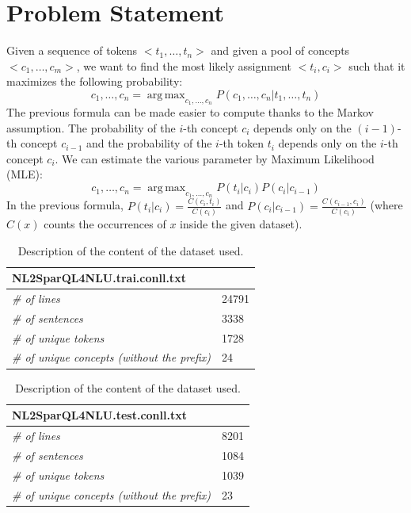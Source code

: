 \documentclass[11pt,a4paper]{article}
\DeclareMathOperator*{\argmax}{arg\,max}
\begin{document}
\section{Problem Statement}
Given a sequence of tokens $<t_1, \ldots, t_n>$ and given a pool of concepts $<c_1, \ldots, c_m>$, we want to find the most likely assignment $<t_i, c_i>$ such that it maximizes the following probability:
\begin{equation}
c_1, \ldots, c_n = \argmax_{c_1, \ldots, c_n} P (c_1, \ldots, c_n | t_1, \ldots, t_n)
\label{frm:argmax}
\end{equation}
The previous formula can be made easier to compute thanks to the Markov assumption. The probability of the $i$-th concept $c_i$ depends only on the $(i-1)$-th concept $c_{i-1}$ and the probability of the $i$-th token $t_i$ depends only on the $i$-th concept $c_i$. We can estimate the various parameter by Maximum Likelihood (MLE):
\begin{equation}
c_1, \ldots, c_n = \argmax_{c_1, \ldots, c_n} P(t_i|c_i)P(c_i| c_{i-1})
\label{frm:argmax-markov-assumption}
\end{equation}
In the previous formula, $P(t_i|c_i) = \frac{C(c_i, t_i)}{C(c_i)}$ and $P(c_i|c_{i-1}) = \frac{C(c_{i-1}, c_i)}{C(c_i)}$ (where $C(x)$ counts the occurrences of $x$ inside the given dataset). 

\begin{table}
    \begin{subtable}{.5\linewidth}
		\centering
\begin{tabular}{|l|l|}
\hline
\multicolumn{2}{|l|}{\textbf{NL2SparQL4NLU.trai.conll.txt}} \\ \hline
\textit{\# of lines}									& 24791 \\ \hline
\textit{\# of sentences}                             & 3338 \\ \hline
\textit{\# of unique tokens}                         & 1728 \\ \hline
\textit{\# of unique concepts (without the prefix)}  & 24   \\ \hline
\end{tabular}
\caption{Train dataset.}
\end{subtable}%
\begin{subtable}{.5\linewidth}
\centering
\begin{tabular}{|l|l|}
\hline
\multicolumn{2}{|l|}{\textbf{NL2SparQL4NLU.test.conll.txt}} \\ \hline
\textit{\# of lines}									& 8201 \\ \hline
\textit{\# of sentences}                             & 1084 \\ \hline
\textit{\# of unique tokens}                         & 1039 \\ \hline
\textit{\# of unique concepts (without the prefix)}  & 23   \\ \hline
\end{tabular}
\caption{Test dataset.}
\label{tab:test-dataset-description}
\end{subtable}
\caption{Description of the content of the dataset used.}
\end{table} 
\end{document}
